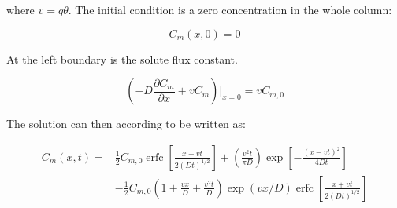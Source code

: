 \documentclass{report}
\newcommand{\erfc}{\operatorname{erfc}}                 %
\begin{document}
where $v=q\theta$. The initial condition is a zero concentration in
the whole column:

\begin{equation}
C_m(x,0)=0
\end{equation}


At the left boundary is the solute flux constant.


\begin{equation}
\left(-D\frac{\partial C_m}{\partial x}+vC_m \right)\bigg\vert_{x=0}=vC_{m,0}
\end{equation}

The solution can then according to \cite{Genuchtenanalytical} be
written as:

\begin{equation}
\begin{split}
C_m(x,t) = &\frac{1}{2} C_{m,0}  \erfc\left
  [\frac{x-vt}{2(Dt)^{1/2}}\right]+\left(\frac{v^2t}{\pi
  D}\right)\exp\left[-\frac{(x-vt)^2}{4Dt}\right ] \\
&-  \frac{1}{2} C_{m,0} (1+\frac{vx}{D}+\frac{v^2t}{D})\exp(vx/D)\erfc\left[\frac{x+vt}{2(Dt)^{1/2}}\right]
\end{split}
\end{equation}

\end{document}

